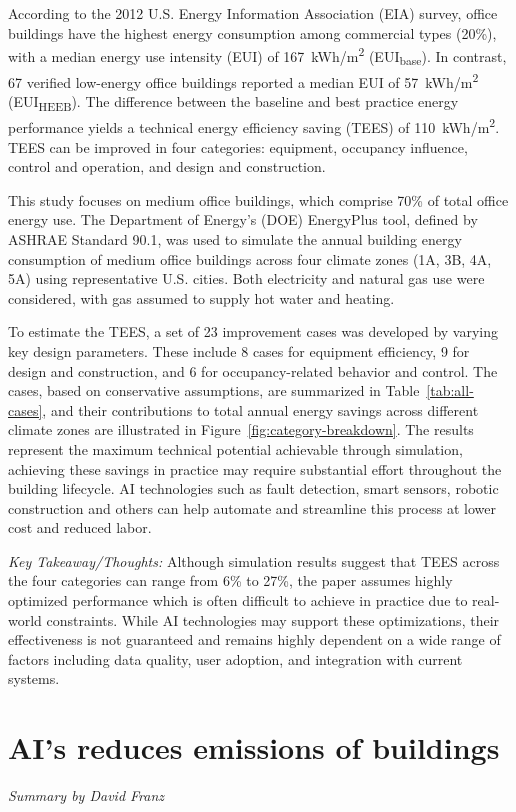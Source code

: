 \documentclass[conference,a4paper]{IEEEtran}
\begin{document}
According to the 2012 U.S. Energy Information Association (EIA) survey, office buildings have the highest energy consumption among commercial types (20\%), with a median energy use intensity (EUI) of 167~kWh/m\textsuperscript{2} (EUI\textsubscript{base}). In contrast, 67 verified low-energy office buildings reported a median EUI of 57~kWh/m\textsuperscript{2} (EUI\textsubscript{HEEB}). The difference between the baseline and best practice energy performance yields a technical energy efficiency saving (TEES) of 110~kWh/m\textsuperscript{2}. TEES can be improved in four categories: equipment, occupancy influence, control and operation, and design and construction.

This study focuses on medium office buildings, which comprise 70\% of total office energy use. The Department of Energy's (DOE) EnergyPlus tool, defined by ASHRAE Standard 90.1, was used to simulate the annual building energy consumption of medium office buildings across four climate zones (1A, 3B, 4A, 5A) using representative U.S. cities. Both electricity and natural gas use were considered, with gas assumed to supply hot water and heating. 

To estimate the TEES, a set of 23 improvement cases was developed by varying key design parameters. These include 8 cases for equipment efficiency, 9 for design and construction, and 6 for occupancy-related behavior and control. The cases, based on conservative assumptions, are summarized in Table~\ref{tab:all-cases}, and their contributions to total annual energy savings across different climate zones are illustrated in Figure~\ref{fig:category-breakdown}. The results represent the maximum technical potential achievable through simulation, achieving these savings in practice may require substantial effort throughout the building lifecycle. AI technologies such as fault detection, smart sensors, robotic construction and others can help automate and streamline this process at lower cost and reduced labor.

\textit{Key Takeaway/Thoughts:} Although simulation results suggest that TEES across the four categories can range from 6\% to 27\%, the paper assumes highly optimized performance which is often difficult to achieve in practice due to real-world constraints. While AI technologies may support these optimizations, their effectiveness is not guaranteed and remains highly dependent on a wide range of factors including data quality, user adoption, and integration with current systems.

\section*{AI's reduces emissions of buildings}
\textit{Summary by David Franz}
\end{document}
